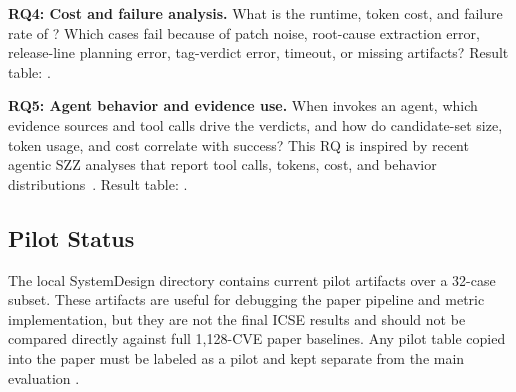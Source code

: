 \textbf{RQ4: Cost and failure analysis.} What is the runtime, token cost, and failure rate of \toolname? Which cases fail because of patch noise, root-cause extraction error, release-line planning error, tag-verdict error, timeout, or missing artifacts? Result table: .

\textbf{RQ5: Agent behavior and evidence use.} When \toolname invokes an agent, which evidence sources and tool calls drive the verdicts, and how do candidate-set size, token usage, and cost correlate with success? This RQ is inspired by recent agentic SZZ analyses that report tool calls, tokens, cost, and behavior distributions~\cite{agentszz2026,howwhyagents2026}. Result table: .

\subsection{Pilot Status}

The local SystemDesign directory contains current pilot artifacts over a 32-case subset. These artifacts are useful for debugging the paper pipeline and metric implementation, but they are not the final ICSE results and should not be compared directly against full 1,128-CVE paper baselines. Any pilot table copied into the paper must be labeled as a pilot and kept separate from the main evaluation .
